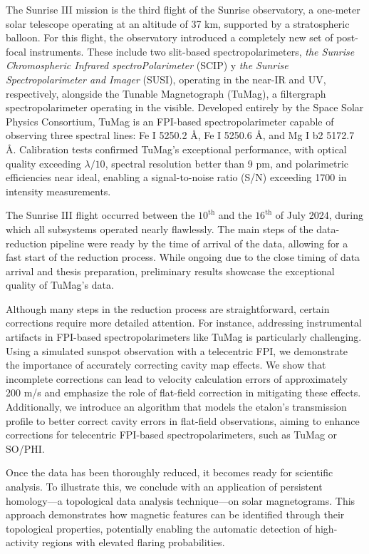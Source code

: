\documentclass[12pt]{mythesis}
\begin{document}
The Sunrise III mission is the third flight of the Sunrise observatory, a one-meter solar telescope operating at an altitude of 37 km, supported by a stratospheric balloon. For this flight, the observatory introduced a completely new set of post-focal instruments. These include two slit-based spectropolarimeters, \textit{the Sunrise Chromospheric Infrared spectroPolarimeter} (SCIP) y \textit{the Sunrise Spectropolarimeter and Imager} (SUSI), operating in the near-IR and UV, respectively, alongside the Tunable Magnetograph (TuMag), a filtergraph spectropolarimeter operating in the visible. Developed entirely by the  Space Solar Physics Consortium, TuMag is an FPI-based spectropolarimeter capable of observing three spectral lines: Fe I 5250.2 Å, Fe I 5250.6 Å, and Mg I b2 5172.7 Å. Calibration tests confirmed TuMag’s exceptional performance, with optical quality exceeding $\lambda/10$, spectral resolution better than 9 pm, and polarimetric efficiencies near ideal, enabling a signal-to-noise ratio (S/N) exceeding 1700 in intensity measurements.

The Sunrise III flight occurred between the $10^{\text{th}}$ and the $16^{\text{th}}$ of July 2024, during which all subsystems operated nearly flawlessly. The main steps of the data-reduction pipeline were ready by the time of arrival of the data, allowing for a fast start of the reduction process. While ongoing due to the close timing of data arrival and thesis preparation, preliminary results showcase the exceptional quality of TuMag’s data.

Although many steps in the reduction process are straightforward, certain corrections require more detailed attention. For instance, addressing instrumental artifacts in FPI-based spectropolarimeters like TuMag is particularly challenging. Using a simulated sunspot observation with a telecentric FPI, we demonstrate the importance of accurately correcting cavity map effects. We show that incomplete corrections can lead to velocity calculation errors of approximately 200 m/s and emphasize the role of flat-field correction in mitigating these effects. Additionally, we introduce an algorithm that models the etalon's transmission profile to better correct cavity errors in flat-field observations, aiming to enhance corrections for telecentric FPI-based spectropolarimeters, such as TuMag or SO/PHI.

Once the data has been thoroughly reduced, it becomes ready for scientific analysis. To illustrate this, we conclude with an application of persistent homology—a topological data analysis technique—on solar magnetograms. This approach demonstrates how magnetic features can be identified through their topological properties, potentially enabling the automatic detection of high-activity regions with elevated flaring probabilities.
\end{document}
